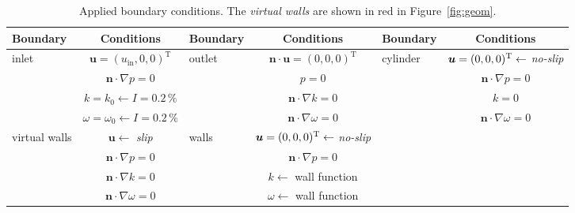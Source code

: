 
\begin{table}[htbp]
\hspace*{-2.0cm}
{
\begin{tabular}{lclclc}
\toprule
    Boundary & Conditions & Boundary & Conditions & Boundary & Conditions \\
\midrule
    \multirow{4}{*}{inlet}
    &
    $\bm{u} = (u_{\mathrm{in}},0,0)^{\mathrm{T}}$ & \multirow{4}{*}{outlet} &  $\bm{n} \cdot \bm{u} = (0,0,0)^{\mathrm{T}}$ & \multirow{4}{*}{cylinder} & $\bm{u} = (0,0,0)^{\mathrm{T}}\leftarrow$ \textit{no-slip}\\
    &
    $\bm{n}\cdot\nabla p = 0$ & & $p = 0$ & & $\bm{n}\cdot\nabla p = 0$\\
    &
    $k = k_{0} \leftarrow I = 0.2\,\%$ & & $\bm{n}\cdot\nabla k = 0$ & & $k = 0$\\
    &
    $\omega = \omega_{0} \leftarrow I = 0.2\,\% $ & & $\bm{n}\cdot \nabla\omega = 0$ & & $\bm{n}\cdot \nabla\omega = 0$\\
\midrule
    \multirow{4}{*}{virtual walls}
    &
    $\bm{u}\leftarrow$ \textit{slip} & \multirow{4}{*}{walls} & $\bm{u} = (0,0,0)^{\mathrm{T}}\leftarrow$ \textit{no-slip}\\
    &
    $\bm{n}\cdot\nabla p = 0$ & & $\bm{n}\cdot\nabla p = 0$\\
    &
    $\bm{n}\cdot\nabla k = 0$ & & $k \leftarrow$ wall function\\
    &
    $\bm{n}\cdot\nabla \omega = 0$ & & $\omega \leftarrow$ wall function\\
\bottomrule
\end{tabular}
}
\caption{Applied boundary conditions. The \textit{virtual walls} are shown in red in Figure~\ref{fig:geom}.}
\label{tab:BC}
\end{table}

